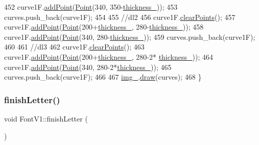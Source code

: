\begin{DoxyCode}
452     curve1F.\mbox{\hyperlink{class_bezier_curve_a38d16c18b36ae45619b05e26e226cf34}{addPoint}}(\mbox{\hyperlink{class_point}{Point}}(340, 350-\mbox{\hyperlink{class_font_v1_aed8040e76be9a52833627b92f0fb4e5f}{thickness\_}}));
453     curves.push\_back(curve1F);
454 
455     \textcolor{comment}{//dl2}
456     curve1F.\mbox{\hyperlink{class_bezier_curve_a0ba8ce66d5af5971ae6a1b506029728e}{clearPoints}}();
457     curve1F.\mbox{\hyperlink{class_bezier_curve_a38d16c18b36ae45619b05e26e226cf34}{addPoint}}(\mbox{\hyperlink{class_point}{Point}}(200+\mbox{\hyperlink{class_font_v1_aed8040e76be9a52833627b92f0fb4e5f}{thickness\_}}, 280-\mbox{\hyperlink{class_font_v1_aed8040e76be9a52833627b92f0fb4e5f}{thickness\_}}));
458     curve1F.\mbox{\hyperlink{class_bezier_curve_a38d16c18b36ae45619b05e26e226cf34}{addPoint}}(\mbox{\hyperlink{class_point}{Point}}(340, 280-\mbox{\hyperlink{class_font_v1_aed8040e76be9a52833627b92f0fb4e5f}{thickness\_}}));
459     curves.push\_back(curve1F);
460 
461     \textcolor{comment}{//dl3}
462     curve1F.\mbox{\hyperlink{class_bezier_curve_a0ba8ce66d5af5971ae6a1b506029728e}{clearPoints}}();
463     curve1F.\mbox{\hyperlink{class_bezier_curve_a38d16c18b36ae45619b05e26e226cf34}{addPoint}}(\mbox{\hyperlink{class_point}{Point}}(200+\mbox{\hyperlink{class_font_v1_aed8040e76be9a52833627b92f0fb4e5f}{thickness\_}}, 280-2*
      \mbox{\hyperlink{class_font_v1_aed8040e76be9a52833627b92f0fb4e5f}{thickness\_}}));
464     curve1F.\mbox{\hyperlink{class_bezier_curve_a38d16c18b36ae45619b05e26e226cf34}{addPoint}}(\mbox{\hyperlink{class_point}{Point}}(340, 280-2*\mbox{\hyperlink{class_font_v1_aed8040e76be9a52833627b92f0fb4e5f}{thickness\_}}));
465     curves.push\_back(curve1F);
466 
467     \mbox{\hyperlink{class_font_v1_a00569e3e3c4b70f437b63f396f735fb0}{img\_}}.\mbox{\hyperlink{class_image_a8d162f3cab956131d58708c09aa560b0}{draw}}(curves);
468 \}
\end{DoxyCode}
\mbox{\label{class_font_v1_a29e1b96b06056aad8542c3d2ac79ebf2}} 
\subsubsection{\texorpdfstring{finish\+Letter()}{finishLetter()}}
{\footnotesize\ttfamily void Font\+V1\+::finish\+Letter (\begin{DoxyParamCaption}{ }\end{DoxyParamCaption})}



